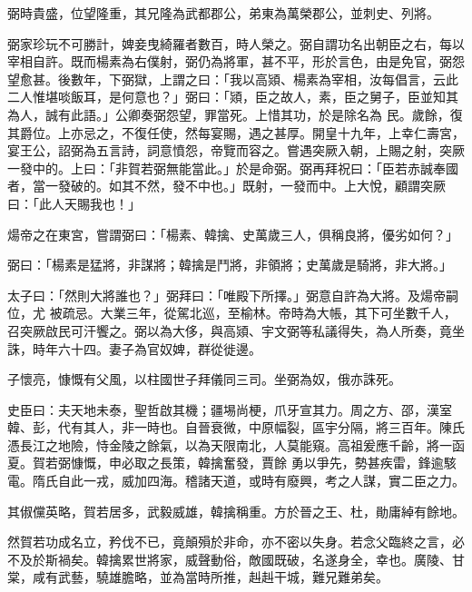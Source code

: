 \begin{pinyinscope}
 弼時貴盛，位望隆重，其兄隆為武都郡公，弟東為萬榮郡公，並刺史、列將。



 弼家珍玩不可勝計，婢妾曳綺羅者數百，時人榮之。弼自謂功名出朝臣之右，每以宰相自許。既而楊素為右僕射，弼仍為將軍，甚不平，形於言色，由是免官，弼怨望愈甚。後數年，下弼獄，上謂之曰：「我以高熲、楊素為宰相，汝每倡言，云此二人惟堪啖飯耳，是何意也？」弼曰：「熲，臣之故人，素，臣之舅子，臣並知其為人，誠有此語。」公卿奏弼怨望，罪當死。上惜其功，於是除名為
 民。歲餘，復其爵位。上亦忌之，不復任使，然每宴賜，遇之甚厚。開皇十九年，上幸仁壽宮，宴王公，詔弼為五言詩，詞意憤怨，帝覽而容之。嘗遇突厥入朝，上賜之射，突厥一發中的。上曰：「非賀若弼無能當此。」於是命弼。弼再拜祝曰：「臣若赤誠奉國者，當一發破的。如其不然，發不中也。」既射，一發而中。上大悅，顧謂突厥曰：「此人天賜我也！」



 煬帝之在東宮，嘗謂弼曰：「楊素、韓擒、史萬歲三人，俱稱良將，優劣如何？」



 弼曰：「楊素是猛將，非謀將；韓擒是鬥將，非領將；史萬歲是騎將，非大將。」



 太子曰：「然則大將誰也？」弼拜曰：「唯殿下所擇。」弼意自許為大將。及煬帝嗣位，尤
 被疏忌。大業三年，從駕北巡，至榆林。帝時為大帳，其下可坐數千人，召突厥啟民可汗饗之。弼以為大侈，與高熲、宇文弼等私議得失，為人所奏，竟坐誅，時年六十四。妻子為官奴婢，群從徙邊。



 子懷亮，慷慨有父風，以柱國世子拜儀同三司。坐弼為奴，俄亦誅死。



 史臣曰：夫天地未泰，聖哲啟其機；疆埸尚梗，爪牙宣其力。周之方、邵，漢室韓、彭，代有其人，非一時也。自晉衰微，中原幅裂，區宇分隔，將三百年。陳氏憑長江之地險，恃金陵之餘氣，以為天限南北，人莫能窺。高祖爰應千齡，將一函夏。賀若弼慷慨，申必取之長策，韓擒奮發，賈餘
 勇以爭先，勢甚疾雷，鋒逾駭電。隋氏自此一戎，威加四海。稽諸天道，或時有廢興，考之人謀，實二臣之力。



 其俶儻英略，賀若居多，武毅威雄，韓擒稱重。方於晉之王、杜，勛庸綽有餘地。



 然賀若功成名立，矜伐不已，竟顛殞於非命，亦不密以失身。若念父臨終之言，必不及於斯禍矣。韓擒累世將家，威聲動俗，敵國既破，名遂身全，幸也。廣陵、甘棠，咸有武藝，驍雄膽略，並為當時所推，赳赳干城，難兄難弟矣。



\end{pinyinscope}